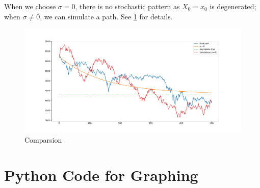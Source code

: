     When we choose $\sigma=0$, there is no stochastic pattern
    as $X_0=x_0$ is degenerated;
    when $\sigma\neq 0$, we can simulate a path.
    See \cref{fig:p5} for details.
    \begin{figure}[h]
        \centering
        \includegraphics[width=\textwidth]{figure}
        \caption{Comparsion}
        \label{fig:p5}
    \end{figure}

    \newpage
    \appendix
    \section{Python Code for Graphing}
    